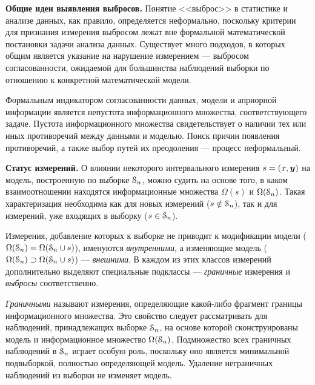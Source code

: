 \documentclass[a5paper,openany]{book}
\newcommand{\mbf}[1]{\protect\text{\boldmath$#1$}}
\newcommand{\eus}{\EuScript}
\begin{document}

{\bf Общие идеи выявления выбросов.} 
Понятие <<выброс>> в статистике и анализе данных, как правило, определяется неформально, поскольку  критерии для признания измерения выбросом 
лежат вне формальной математической постановки задачи анализа данных.
Существует много подходов, в которых общим является указание на нарушение измерением --- выбросом согласованности, ожидаемой для большинства 
наблюдений выборки по отношению к конкретной математической модели. 

Формальным индикатором согласованности данных, 
модели и априорной информации является непустота информационного множества, соответствующего 
задаче. Пустота информационного множества свидетельствует о наличии тех или иных 
противоречий между данными и моделью. Поиск причин появления противоречий, а также 
выбор путей их преодоления — процесс неформальный. 

{\bf Статус измерений.} О влиянии некоторого интервального измерения $s = (x,\mbf{y})$ на модель, построенную \label{MeasrStatusSect} 
по выборке $\eus{S}_{n}$, можно судить на основе того, в каком взаимоотношении находятся 
информационные множества $\Omega(s)$ и $\Omega(\eus{S}_{n})$. Такая характеризация 
необходима как для новых измерений ($s \notin \eus{S}_{n}$), так и для измерений, уже 
входящих в выборку ($s \in \eus{S}_{n}$). 

Измерения, добавление которых к выборке не приводит к модификации модели 
($\Omega(\eus{S}_{n}) = \Omega(\eus{S}_{n} \cup s)$), именуются %
\textit{внутренними}, а изменяющие модель 
($\Omega(\eus{S}_{n}) \supset \Omega(\eus{S}_{n} \cup s)$) --- \textit{внешними}. 
В каждом из этих классов измерений дополнительно выделяют специальные подклассы 
--- \textit{граничные} измерения и \textit{выбросы} соответственно. 

\textit{Граничными} называют измерения, определяющие какой-либо фрагмент границы 
информационного множества. Это свойство следует рассматривать для 
наблюдений, принадлежащих выборке $\eus{S}_{n}$, на основе которой сконструированы модель 
и информационное множество $\Omega(\eus{S}_{n})$. Подмножество всех граничных 
наблюдений в $\eus{S}_{n}$ играет особую роль, поскольку оно является минимальной 
подвыборкой, полностью определяющей модель. Удаление неграничных наблюдений из выборки 
не изменяет модель.      
\end{document}
